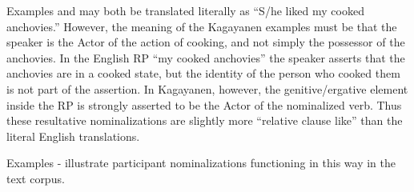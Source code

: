 Examples  and  may both be translated literally as “S/he liked my cooked anchovies.” However, the meaning of the Kagayanen examples must be that the speaker is the Actor of the action of cooking, and not simply the possessor of the anchovies. In the English RP “my cooked anchovies” the speaker asserts that the anchovies are in a cooked state, but the identity of the person who cooked them is not part of the assertion. In Kagayanen, however, the genitive/ergative element inside the RP is strongly asserted to be the Actor of the nominalized verb. Thus these resultative nominalizations are slightly more “relative clause like” than the literal English translations.

Examples - illustrate participant nominalizations functioning in this way in the text corpus.

